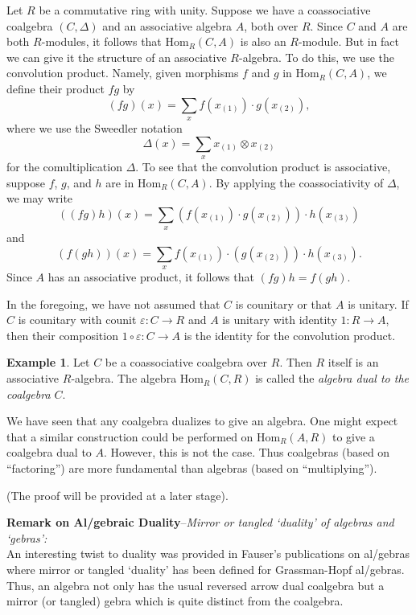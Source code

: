 \documentclass[12pt]{article}
\newcommand{\Hom}[3][]{\mathrm{Hom}_{#1}({#2},{#3})}
\theoremstyle{definition}
\newtheorem*{example*}{Example}
\begin{document}

Let $R$ be a commutative ring with unity.  Suppose we have a coassociative coalgebra $(C,\Delta)$ and an associative algebra $A$, both over $R$.  Since $C$ and $A$ are both $R$-modules, it follows that $\Hom[R]{C}{A}$ is also an $R$-module.  But in fact we can give it the structure of an associative $R$-algebra.  To do this, we use the convolution product.  Namely, given morphisms $f$ and $g$ in $\Hom[R]{C}{A}$, we define their product $fg$ by
\[
(fg)(x) = \sum_x f(x_{(1)})\cdot g(x_{(2)}),
\]
where we use the Sweedler notation 
\[
\Delta(x) = \sum_x x_{(1)}\otimes x_{(2)}
\]
for the comultiplication $\Delta$.  To see that the convolution product is associative, suppose $f$, $g$, and $h$ are in $\Hom[R]{C}{A}$.  By applying the coassociativity of $\Delta$, we may write
\[
((fg)h)(x) = \sum_x (f(x_{(1)})\cdot g(x_{(2)}))\cdot h(x_{(3)})
\]
and
\[
(f(gh))(x) = \sum_x f(x_{(1)})\cdot (g(x_{(2)}))\cdot h(x_{(3)}).
\]
Since $A$ has an associative product, it follows that $(fg)h=f(gh)$.

In the foregoing, we have not assumed that $C$ is counitary or that $A$ is unitary.  If $C$ is counitary with counit $\varepsilon\colon C\to R$ and $A$ is unitary with identity $1\colon R\to A$, then their composition $1\circ\varepsilon\colon C\to A$ is the identity for the convolution product.

\begin{example*}
Let $C$ be a coassociative coalgebra over $R$.  Then $R$ itself is an associative $R$-algebra.  The algebra $\Hom[R]{C}{R}$ is called the \emph{algebra dual to the coalgebra $C$}.
\end{example*}

We have seen that any coalgebra dualizes to give an algebra.  One might expect that a similar construction could be performed on $\Hom[R]{A}{R}$ to give a coalgebra dual to $A$.  However, this is not the case.  Thus coalgebras (based on ``factoring'') are more fundamental than algebras (based on ``multiplying'').

(The proof will be provided at a later stage).

\textbf{Remark on Al/gebraic Duality}--{\em Mirror or tangled `duality' of algebras and `gebras':} \\
An interesting twist to duality was provided in Fauser's publications on al/gebras
where mirror or tangled `duality' has been defined for Grassman-Hopf al/gebras. Thus,
an algebra not only has the usual reversed arrow dual coalgebra but a mirror (or tangled)
gebra which is quite distinct from the coalgebra.
\end{document}
